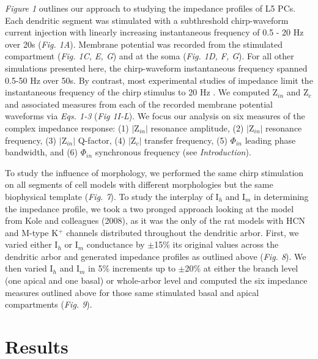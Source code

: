 \documentclass[utf8]{frontiersSCNS} %
\begin{document}
\emph{Figure 1} outlines our approach to studying the impedance profiles of L5 PCs.
Each dendritic segment was stimulated with a subthreshold chirp-waveform current injection with linearly increasing 
instantaneous frequency of 0.5 - 20 Hz over 20s (\emph{Fig. 1A}).
Membrane potential was recorded from the stimulated compartment (\emph{Fig. 1C, E, G}) and at the soma (\emph{Fig. 1D, F, G}). 
For all other simulations presented here, the chirp-waveform instantaneous frequency spanned 0.5-50 Hz over 50s.  By contrast,
most experimental studies of impedance limit the instantaneous frequency of the chirp stimulus to 20 Hz \citep{Ulrich2002-dd, Dembrow2015-zb}. 
We computed Z$_{in}$ and Z$_c$ and associated measures from each of the  recorded membrane potential waveforms via \emph{Eqs. 1-3} (\emph{Fig 1I-L}). 
We focus our analysis on six measures of the complex impedance response: 
(1) $|$Z$_{in}|$ resonance amplitude, 
(2) $|$Z$_{in}|$ resonance frequency,
(3) $|$Z$_{in}|$ Q-factor, 
(4) $|$Z$_{c}|$ transfer frequency, 
(5) $\Phi_{in}$ leading phase bandwidth, 
and (6) $\Phi_{in}$ synchronous frequency (see \emph{Introduction}).

To study the influence of morphology, we performed the same chirp stimulation on all segments of cell models with
different morphologies but the same biophysical template \citep{Hay2011-if} (\emph{Fig. 7}).  
To study the interplay of I$_h$ and I$_m$ in determining the impedance profile, we took a two pronged approach looking at the model from Kole and colleagues (2008),
as it was the only of the rat models with HCN and M-type K$^+$ channels distributed throughout the dendritic arbor.
First, we varied either I$_h$ or I$_m$ conductance by $\pm$15\% its original values across the dendritic arbor and generated impedance profiles as outlined above (\emph{Fig. 8}).  
We then varied I$_h$ and I$_m$ in 5\% increments up to $\pm$20\% at either the branch level (one apical and one basal) or whole-arbor level and computed the six 
impedance measures outlined above for those same stimulated basal and apical compartments (\emph{Fig. 9}).

\section{Results}
\end{document}
